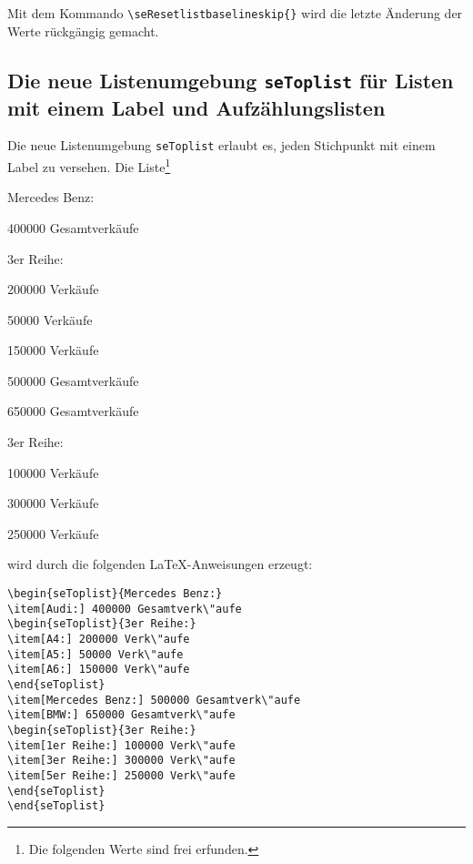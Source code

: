 Mit dem Kommando \newline
\hspace*{\fill}\verb+\seResetlistbaselineskip{}+\hspace*{\fill}\newline
wird die letzte \"Anderung der Werte r\"uckg\"angig gemacht.

\newpage
\subsection{Die neue Listenumgebung \texttt{seToplist} f\"ur Listen mit einem Label und Aufz\"ahlungslisten}

Die neue Listenumgebung \verb+seToplist+ erlaubt es, jeden Stichpunkt mit einem Label zu versehen.
Die Liste\footnote{Die folgenden Werte sind frei erfunden.} 

\begin{seToplist}{Mercedes Benz:}
\item[Audi:] 400000 Gesamtverk\"aufe
\begin{seToplist}{3er Reihe:}
\item[A4:] 200000 Verk\"aufe
\item[A5:] 50000 Verk\"aufe
\item[A6:] 150000 Verk\"aufe
\end{seToplist}
\item[Mercedes Benz:] 500000 Gesamtverk\"aufe 
\item[BMW:] 650000 Gesamtverk\"aufe 
\begin{seToplist}{3er Reihe:}
\item[1er Reihe:] 100000 Verk\"aufe
\item[3er Reihe:] 300000 Verk\"aufe
\item[5er Reihe:] 250000 Verk\"aufe
\end{seToplist}
\end{seToplist}

wird durch die folgenden \LaTeX-Anweisungen erzeugt:

\vspace*{-\baselineskip}
\begin{verbatim}
\begin{seToplist}{Mercedes Benz:}
\item[Audi:] 400000 Gesamtverk\"aufe
\begin{seToplist}{3er Reihe:}
\item[A4:] 200000 Verk\"aufe
\item[A5:] 50000 Verk\"aufe
\item[A6:] 150000 Verk\"aufe
\end{seToplist}
\item[Mercedes Benz:] 500000 Gesamtverk\"aufe 
\item[BMW:] 650000 Gesamtverk\"aufe 
\begin{seToplist}{3er Reihe:}
\item[1er Reihe:] 100000 Verk\"aufe
\item[3er Reihe:] 300000 Verk\"aufe
\item[5er Reihe:] 250000 Verk\"aufe
\end{seToplist}
\end{seToplist}
\end{verbatim}

